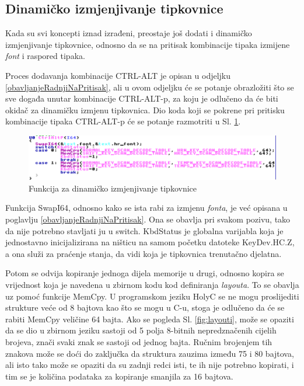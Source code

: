\documentclass{foi}
\begin{document}
\subsection{Dinamičko izmjenjivanje tipkovnice\label{dinamickoIzmjenjivanjeTipkovnice}}

Kada su svi koncepti iznad izrađeni, preostaje još dodati i dinamičko izmjenjivanje tipkovnice, odnosno da se na pritisak kombinacije tipaka izmijene \emph{font} i raspored tipaka.

Proces dodavanja kombinacije {\selectfont CTRL-ALT} je opisan u odjeljku \ref{obavljanjeRadnjiNaPritisak}, ali u ovom odjeljku će se potanje obrazložiti što se sve događa unutar kombinacije {\selectfont CTRL-ALT-p}, za koju je odlučeno da će biti okidač za dinamičku izmjenu tipkovnica. Dio koda koji se pokrene pri pritisku kombinacije tipaka {\selectfont CTRL-ALT-p} će se potanje razmotriti u Sl. \ref{fig:ctrlaltp}.

\begin{figure}[H]
    \centering
    \includegraphics[width=1.0\textwidth]{slike/ctrlaltp.png}
	\caption{Funkcija za dinamičko izmjenjivanje tipkovnice}
    \label{fig:ctrlaltp}
\end{figure}

Funkcija {\selectfont SwapI64}, odnosno kako se ista rabi za izmjenu \emph{fonta}, je već opisana u poglavlju \ref{obavljanjeRadnjiNaPritisak}. Ona se obavlja pri svakom pozivu, tako da nije potrebno stavljati ju u {\selectfont switch}. {\selectfont KbdStatus} je globalna varijabla koja je jednostavno inicijalizirana na ništicu na samom početku datoteke {\selectfont KeyDev.HC.Z}, a ona služi za praćenje stanja, da vidi koja je tipkovnica trenutačno djelatna.

Potom se odvija kopiranje jednoga dijela memorije u drugi, odnosno kopira se vrijednost koja je navedena u zbirnom kodu kod definiranja \emph{layouta}. To se obavlja uz pomoć funkcije {\selectfont MemCpy}. U programskom jeziku HolyC se ne mogu proslijediti strukture veće od 8 bajtova kao što se mogu u C-u, stoga je odlučeno da će se rabiti {\selectfont MemCpy} veličine 64 bajta. Ako se pogleda Sl. \ref{fig:layouti}, može se opaziti da se dio u zbirnom jeziku sastoji od 5 polja 8-bitnih nepredznačenih cijelih brojeva, znači svaki znak se sastoji od jednog bajta. Ručnim brojenjem tih znakova može se doći do zaključka da struktura zauzima između 75 i 80 bajtova, ali isto tako može se opaziti da su zadnji redci isti, te ih nije potrebno kopirati, i tim se je količina podataka za kopiranje smanjila za 16 bajtova.
\end{document}
